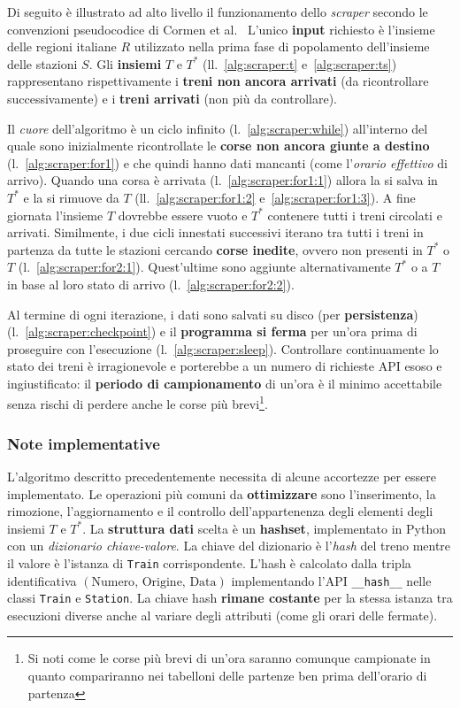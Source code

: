 \documentclass[12pt,a4paper,italian]{report}
\begin{document}
Di seguito è illustrato ad alto livello il funzionamento dello
\textit{scraper} secondo le convenzioni pseudocodice di Cormen et
al.\@~\cite{Cormen} L'unico \textbf{input} richiesto è l'insieme delle
regioni italiane $R$ utilizzato nella prima fase di popolamento
dell'insieme delle stazioni $S$.  Gli \textbf{insiemi} $T$ e $T^*$
(ll.\@~\ref{alg:scraper:t} e~\ref{alg:scraper:ts}) rappresentano
rispettivamente i \textbf{treni non ancora arrivati} (da ricontrollare
successivamente) e i \textbf{treni arrivati} (non più da controllare).

Il \textit{cuore} dell'algoritmo è un ciclo infinito
(l.\@~\ref{alg:scraper:while}) all'interno del quale sono inizialmente
ricontrollate le \textbf{corse non ancora giunte a destino}
(l.\@~\ref{alg:scraper:for1}) e che quindi hanno dati mancanti (come
l'\textit{orario effettivo} di arrivo).  Quando una corsa è arrivata
(l.\@~\ref{alg:scraper:for1:1}) allora la si salva in $T^*$ e la si
rimuove da $T$ (ll.\@~\ref{alg:scraper:for1:2}
e~\ref{alg:scraper:for1:3}).  A fine giornata l'insieme $T$ dovrebbe
essere vuoto e $T^*$ contenere tutti i treni circolati e arrivati.
Similmente, i due cicli innestati successivi iterano tra tutti i treni
in partenza da tutte le stazioni cercando \textbf{corse inedite},
ovvero non presenti in $T^*$ o $T$ (l.\@~\ref{alg:scraper:for2:1}).
Quest'ultime sono aggiunte alternativamente $T^*$ o a $T$ in base al
loro stato di arrivo (l.\@~\ref{alg:scraper:for2:2}).

Al termine di ogni iterazione, i dati sono salvati su disco (per
\textbf{persistenza}) (l.\@~\ref{alg:scraper:checkpoint}) e il
\textbf{programma si ferma} per un'ora prima di proseguire con
l'esecuzione (l.\@~\ref{alg:scraper:sleep}).  Controllare
continuamente lo stato dei treni è irragionevole e porterebbe a un
numero di richieste API esoso e ingiustificato: il \textbf{periodo di
    campionamento} di un'ora è il minimo accettabile senza rischi di
perdere anche le corse più brevi\footnote{Si noti come le corse più
    brevi di un'ora saranno comunque campionate in quanto compariranno
    nei tabelloni delle partenze ben prima dell'orario di partenza}.

\subsubsection{Note implementative}

L'algoritmo descritto precedentemente necessita di alcune accortezze
per essere implementato.  Le operazioni più comuni da
\textbf{ottimizzare} sono l'inserimento, la rimozione, l'aggiornamento
e il controllo dell'appartenenza degli elementi degli insiemi $T$ e
$T^*$.  La \textbf{struttura dati} scelta è un \textbf{hashset},
implementato in Python con un \textit{dizionario chiave-valore}.  La
chiave del dizionario è l'\textit{hash} del treno mentre il valore è
l'istanza di \texttt{Train} corrispondente.  L'hash è calcolato dalla
tripla identificativa
$(\textrm{Numero}, \, \textrm{Origine}, \, \textrm{Data})$
implementando l'API \texttt{\_\_hash\_\_} nelle classi \texttt{Train}
e \texttt{Station}.  La chiave hash \textbf{rimane costante} per la
stessa istanza tra esecuzioni diverse anche al variare degli attributi
(come gli orari delle fermate).
\end{document}
